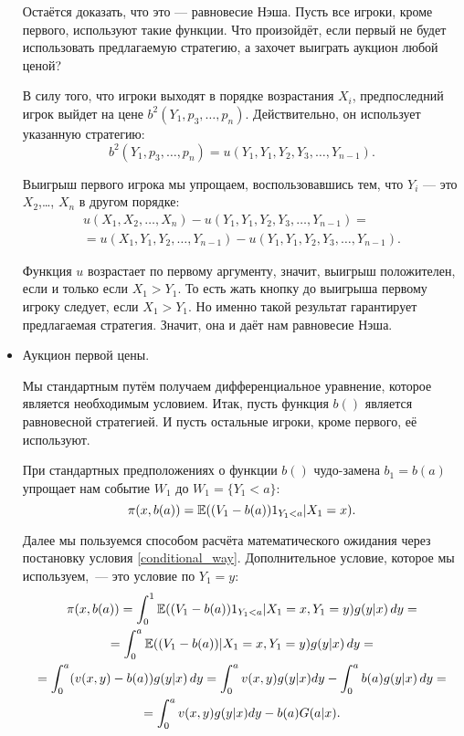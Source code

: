 \begin{itemize}
Остаётся доказать, что это — равновесие Нэша. Пусть все игроки, кроме первого, используют такие функции. Что произойдёт, если первый не будет использовать предлагаемую стратегию, а захочет выиграть аукцион любой ценой?

В силу того, что игроки выходят в порядке возрастания $ X_{i} $, предпоследний игрок выйдет на цене $ b^{2}(Y_{1},p_{3},\ldots,p_{n}) $. Действительно, он использует указанную стратегию:
\begin{equation}
b^{2}(Y_{1},p_{3},\ldots,p_{n}) =u(Y_{1},Y_{1},Y_{2},Y_{3},\ldots,Y_{n-1}).
\end{equation}

Выигрыш первого игрока мы упрощаем, воспользовавшись тем, что $ Y_{i} $ — это $ X_{2} $,\ldots, $ X_{n} $ в другом порядке:
\begin{multline}
u(X_{1},X_{2},\ldots,X_{n})-u(Y_{1},Y_{1},Y_{2},Y_{3},\ldots,Y_{n-1})=\\
=u(X_{1},Y_{1},Y_{2},\ldots,Y_{n-1})-u(Y_{1},Y_{1},Y_{2},Y_{3},\ldots,Y_{n-1}).
\end{multline}

Функция $ u $ возрастает по первому аргументу, значит, выигрыш положителен, если и только если $ X_{1}>Y_{1} $. То есть жать кнопку до выигрыша первому игроку следует, если $ X_{1}>Y_{1} $. Но именно такой результат гарантирует предлагаемая стратегия. Значит, она и даёт нам равновесие Нэша.


\item Аукцион первой цены.

Мы стандартным путём получаем дифференциальное уравнение, которое является необходимым условием. Итак, пусть функция $ b() $ является равновесной стратегией. И пусть остальные игроки, кроме первого, её используют.

При стандартных предположениях о функции $ b() $ чудо-замена $ b_{1}=b(a) $ упрощает нам событие $ W_{1} $ до $ W_{1}=\{Y_{1}<a\} $:
\begin{equation}
\pi(x,b(a))=\operatorname{\mathbb{E}}((V_{1}-b(a))1_{Y_{1}<a}|X_{1}=x).
\end{equation}

Далее мы пользуемся способом расчёта математического ожидания через постановку условия \ref{conditional_way}. Дополнительное условие, которое мы используем,~— это условие по $ Y_{1}=y $:
\begin{multline}
\pi(x,b(a))=
\int_{0}^{1}\operatorname{\mathbb{E}}((V_{1}-b(a))1_{Y_{1}<a}|X_{1}=x,Y_{1}=y)g(y|x) \, dy=\\
=\int_{0}^{a}\operatorname{\mathbb{E}}((V_{1}-b(a))|X_{1}=x,Y_{1}=y)g(y|x) \, dy=\\
=\int_{0}^{a}(v(x,y)-b(a))g(y|x) \, dy
=\int_{0}^{a}v(x,y)g(y|x)dy-\int_{0}^{a}b(a)g(y|x) \, dy=\\
=\int_{0}^{a}v(x,y)g(y|x)dy-b(a)G(a|x).
\end{multline}


\end{itemize}
